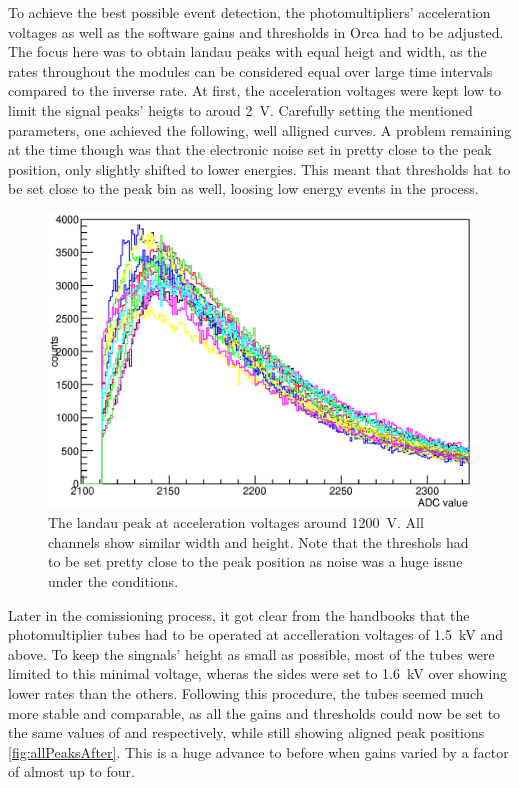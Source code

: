 	To achieve the best possible event detection, the photomultipliers' acceleration voltages as well as the software gains and thresholds in Orca had to be adjusted.
	The focus here was to obtain landau peaks with equal heigt and width, as the rates throughout the modules can be considered equal over large time intervals compared to the inverse rate.
	At first, the acceleration voltages were kept low to limit the signal peaks' heigts to aroud \SI{2}{\volt}. Carefully setting the mentioned parameters, one achieved the following, well alligned curves. A problem remaining at the time though was that the electronic noise set in pretty close to the peak position, only slightly shifted to lower energies. This meant that thresholds hat to be set close to the peak bin as well, loosing low energy events in the process.
	\begin{figure}
		\centering
		\includegraphics[width = 0.9 \textwidth]{graphics/setup/LandauPeaksRun660_old.eps}
		\caption{The landau peak at acceleration voltages around \SI{1200}{\volt}. All channels show similar width and height. Note that the threshols had to be set pretty close to the peak position as noise was a huge issue under the conditions.}
		\label{fig:allPeaksBefore}
	\end{figure}

	Later in the comissioning process, it got clear from the handbooks that the photomultiplier tubes had to be operated at accelleration voltages of \SI{1.5}{\kilo\volt} and above. To keep the singnals' height as small as possible, most of the tubes were limited to this minimal voltage, wheras the sides  were set to \SI{1.6}{\kilo\volt} over showing lower rates than the others. Following this procedure, the tubes seemed much more stable and comparable, as all the gains and thresholds could now be set to the same values of  and respectively, while still showing aligned peak positions \ref{fig:allPeaksAfter}. This is a huge advance to before when gains varied by a factor of almost up to four.
	
